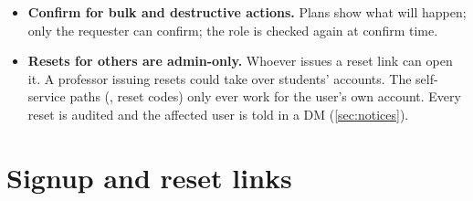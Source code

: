 \begin{itemize}
        cross-signed by its owner's identity, and (3) while that identity's master key is the
        one the bot pinned when it first saw the user (table ). After an
        identity reset the commands are refused and the audit room is told; an admin accepts
        the new identity with  after checking with the
        person outside Matrix. maubot drops mautrix's per-event trust state when it wraps
        events, so the check fetches the event again and decrypts it a second time (allowed:
        mautrix doesn't ratchet keys on decrypt in maubot 0.6.0). Public commands are not
        checked. Instance config  (default on; off only for
        the local dev stack without encryption).
  \item \textbf{Confirm for bulk and destructive actions.} Plans show what will happen; only
        the requester can confirm; the role is checked again at confirm time.
  \item \textbf{Resets for others are admin-only.} Whoever issues a reset link can open it. A
        professor issuing resets could take over students' accounts. The self-service paths
        (, reset codes) only ever work for the user's own account. Every reset
        is audited and the affected user is told in a DM (\autoref{sec:notices}).
\end{itemize}

\section{Signup and reset links}

